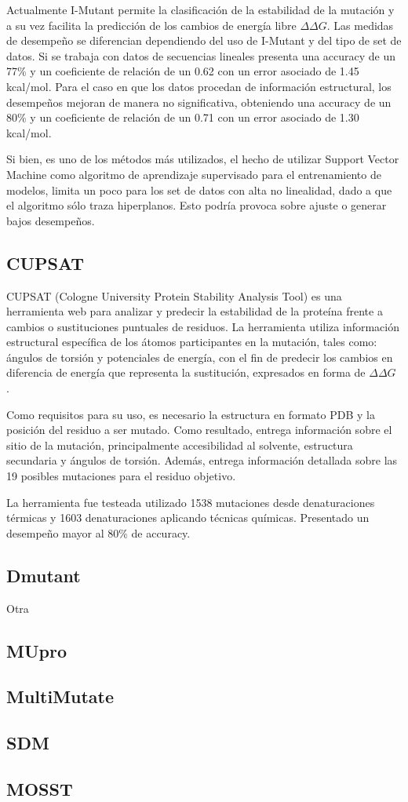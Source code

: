Actualmente  I-Mutant permite la clasificación de la estabilidad de la mutación y a su vez facilita la predicción de los cambios de energía libre $\Delta \Delta G$. Las medidas de desempeño se diferencian dependiendo del uso de I-Mutant y del tipo de set de datos. Si se trabaja con datos de secuencias lineales presenta una accuracy de un 77\% y un coeficiente de relación de un 0.62 con un error asociado de 1.45 kcal/mol. Para el caso en que los datos procedan de información estructural, los desempeños mejoran de manera no significativa, obteniendo una accuracy de un 80\% y un coeficiente de relación de un 0.71 con un error asociado de 1.30 kcal/mol.

Si bien, es uno de los métodos más utilizados, el hecho de utilizar Support Vector Machine como algoritmo de aprendizaje supervisado para el entrenamiento de modelos, limita un poco para los set de datos con alta no linealidad, dado a que el algoritmo sólo traza hiperplanos. Esto podría provoca sobre ajuste o generar bajos desempeños.

\subsection{CUPSAT}

CUPSAT (Cologne University Protein Stability Analysis Tool) es una herramienta web para analizar y predecir la estabilidad de la proteína frente a cambios o sustituciones puntuales de residuos. La herramienta utiliza información estructural específica de los átomos participantes en la mutación, tales como: ángulos de torsión y potenciales de energía, con el fin de predecir los cambios en diferencia de energía que representa la sustitución, expresados en forma de $\Delta \Delta G$ \cite{Parthiban2006}. 

Como requisitos para su uso, es necesario la estructura en formato PDB y la posición del residuo a ser mutado. Como resultado, entrega información sobre el sitio de la mutación, principalmente accesibilidad al solvente, estructura secundaria y ángulos de torsión. Además, entrega información detallada sobre las 19 posibles mutaciones para el residuo objetivo.

La herramienta fue testeada utilizado 1538 mutaciones desde denaturaciones térmicas y 1603 denaturaciones aplicando técnicas químicas. Presentado un desempeño mayor al 80\% de accuracy.

\subsection{Dmutant}

Otra \cite{Zhou2002}
\subsection{MUpro}

\subsection{MultiMutate}

\subsection{SDM}

\subsection{MOSST}

